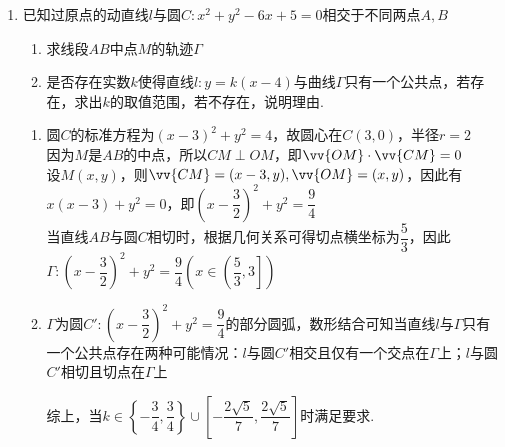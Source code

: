 \begin{enumerate}
\begin{enumerate}
\begin{jieda}
            $AC: y = -\dfrac{x}{2}+5, BD: y = 0$，$M(10, 0)$

            $AD: y = -x+5, BC: y = \dfrac{x}{3}+\dfrac{5}{3}$，$N\left(\dfrac{5}{2}, \dfrac{5}{2}\right)$
        \end{jieda}
    \end{enumerate}
    \item 已知过原点的动直线$l$与圆$C: x^2+y^2-6x+5=0$相交于不同两点$A, B$
    \begin{enumerate}
        \item 求线段$AB$中点$M$的轨迹$\Gamma$
        \item 是否存在实数$k$使得直线$l: y = k(x-4)$与曲线$\Gamma$只有一个公共点，若存在，求出$k$的取值范围，若不存在，说明理由.
    \end{enumerate}
    \begin{jieda}
        \begin{enumerate}
            \item 圆$C$的标准方程为$(x-3)^2+y^2 = 4$，故圆心在$C(3, 0)$，半径$r = 2$ \\
                因为$M$是$AB$的中点，所以$CM \perp OM$，即$\vv{OM} \cdot \vv{CM} = 0$ \\
                设$M(x, y)$，则$\vv{CM} = (x-3, y), \vv{OM} = (x, y)$，因此有$x(x-3) + y^2 = 0$，即$\left(x-\dfrac{3}{2}\right)^2+y^2 = \dfrac{9}{4}$ \\
                当直线$AB$与圆$C$相切时，根据几何关系可得切点横坐标为$\dfrac{5}{3}$，因此$\Gamma : \left(x-\dfrac{3}{2}\right)^2+y^2 = \dfrac{9}{4} \left(x \in \left(\dfrac{5}{3}, 3\right]\right)$
            \item $\Gamma$为圆$C': \left(x-\dfrac{3}{2}\right)^2+y^2 = \dfrac{9}{4}$的部分圆弧，数形结合可知当直线$l$与$\Gamma$只有一个公共点存在两种可能情况：$l$与圆$C'$相交且仅有一个交点在$\Gamma$上；$l$与圆$C'$相切且切点在$\Gamma$上
            综上，当$k \in \left\{-\dfrac{3}{4}, \dfrac{3}{4}\right\} \cup \left[-\dfrac{2\sqrt{5}}{7}, \dfrac{2\sqrt{5}}{7}\right]$时满足要求.
            

\end{enumerate}
\end{jieda}
\end{enumerate}

